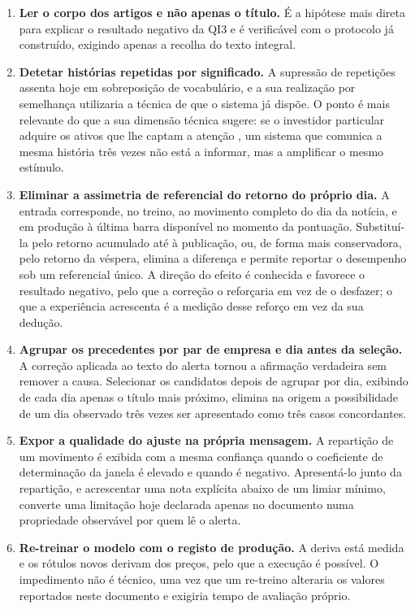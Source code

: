 \begin{enumerate}
  \item \textbf{Ler o corpo dos artigos e não apenas o título.} É a hipótese mais direta para
        explicar o resultado negativo da \gls{QI}3 e é verificável com o protocolo já construído,
        exigindo apenas a recolha do texto integral.

  \item \textbf{Detetar histórias repetidas por significado.} A supressão de repetições assenta hoje
        em sobreposição de vocabulário, e a sua realização por semelhança utilizaria a técnica de que
        o sistema já dispõe. O ponto é mais relevante do que a sua dimensão técnica sugere: se o
        investidor particular adquire os ativos que lhe captam a atenção
        \autocite{barber2008glitters}, um sistema que comunica a mesma história três vezes não está a
        informar, mas a amplificar o mesmo estímulo.

  \item \textbf{Eliminar a assimetria de referencial do retorno do próprio dia.} A entrada
        corresponde, no treino, ao movimento completo do dia da notícia, e em produção à última
        barra disponível no momento da pontuação. Substituí-la pelo retorno acumulado até à
        publicação, ou, de forma mais conservadora, pelo retorno da véspera, elimina a diferença e
        permite reportar o desempenho sob um referencial único. A direção do efeito é conhecida e
        favorece o resultado negativo, pelo que a correção o reforçaria em vez de o desfazer; o que
        a experiência acrescenta é a medição desse reforço em vez da sua dedução.

  \item \textbf{Agrupar os precedentes por par de empresa e dia antes da seleção.} A correção
        aplicada ao texto do alerta tornou a afirmação verdadeira sem remover a causa. Selecionar os
        candidatos depois de agrupar por dia, exibindo de cada dia apenas o título mais próximo,
        elimina na origem a possibilidade de um dia observado três vezes ser apresentado como três
        casos concordantes.

  \item \textbf{Expor a qualidade do ajuste na própria mensagem.} A repartição de um movimento é
        exibida com a mesma confiança quando o coeficiente de determinação da janela é elevado e
        quando é negativo. Apresentá-lo junto da repartição, e acrescentar uma nota explícita abaixo
        de um limiar mínimo, converte uma limitação hoje declarada apenas no documento numa
        propriedade observável por quem lê o alerta.

  \item \textbf{Re-treinar o modelo com o registo de produção.} A deriva está medida e os rótulos
        novos derivam dos preços, pelo que a execução é possível. O impedimento não é técnico, uma
        vez que um re-treino alteraria os valores reportados neste documento e exigiria tempo de
        avaliação próprio.
\end{enumerate}


